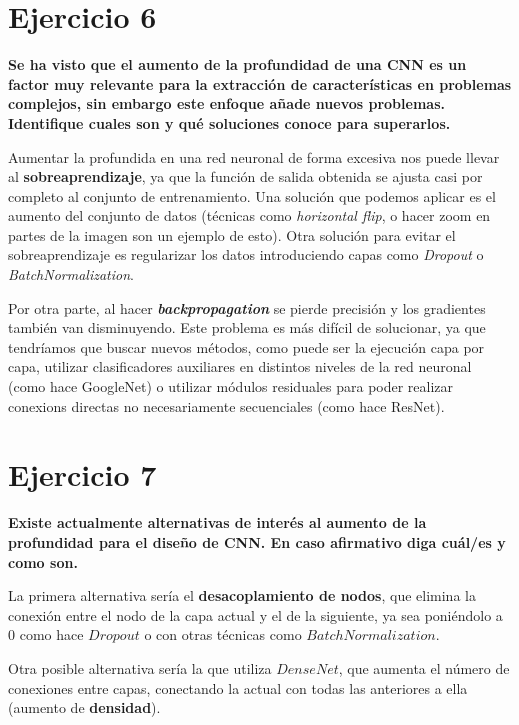 \documentclass[11pt,a4paper]{article}
\begin{document}
\section*{Ejercicio 6}

\textbf{Se ha visto que el aumento de la profundidad de una CNN es un factor muy relevante para la extracción de características en problemas complejos, sin
embargo este enfoque añade nuevos problemas. Identifique cuales son y qué soluciones conoce para superarlos.}

Aumentar la profundida en una red neuronal de forma excesiva nos puede llevar al \textbf{sobreaprendizaje}, ya que la función de salida obtenida se ajusta casi por
completo al conjunto de entrenamiento. Una solución que podemos aplicar es el aumento del conjunto de datos (técnicas como \textit{horizontal flip}, o hacer zoom en
partes de la imagen son un ejemplo de esto). Otra solución para evitar el sobreaprendizaje es regularizar los datos introduciendo capas como \textit{Dropout} o
\textit{BatchNormalization}.

Por otra parte, al hacer \textbf{\textit{backpropagation}} se pierde precisión y los gradientes también van disminuyendo. Este problema es más difícil de solucionar,
ya que tendríamos que buscar nuevos métodos, como puede ser la ejecución capa por capa, utilizar clasificadores auxiliares en distintos niveles de la red neuronal
(como hace GoogleNet) o utilizar módulos residuales para poder realizar conexions directas no necesariamente secuenciales (como hace ResNet).


\section*{Ejercicio 7}

\textbf{Existe actualmente alternativas de interés al aumento de la profundidad para el diseño de CNN. En caso afirmativo diga cuál/es y como son.}

La primera alternativa sería el \textbf{desacoplamiento de nodos}, que elimina la conexión entre el nodo de la capa actual y el de la siguiente, ya sea poniéndolo
a 0 como hace $Dropout$ o con otras técnicas como $BatchNormalization$.

Otra posible alternativa sería la que utiliza $DenseNet$, que aumenta el número de conexiones entre capas, conectando la actual con todas las anteriores a ella
(aumento de \textbf{densidad}).
\end{document}
